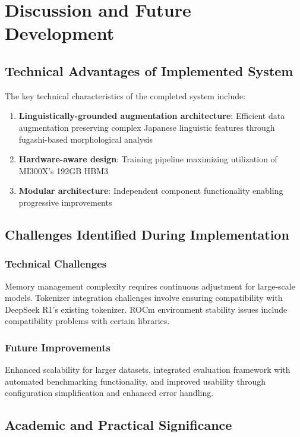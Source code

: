 \documentclass[11pt,a4paper]{article}
\begin{document}
\section{Discussion and Future Development}

\subsection{Technical Advantages of Implemented System}

The key technical characteristics of the completed system include:

\begin{enumerate}
\item \textbf{Linguistically-grounded augmentation architecture}: Efficient data augmentation preserving complex Japanese linguistic features through fugashi-based morphological analysis
\item \textbf{Hardware-aware design}: Training pipeline maximizing utilization of MI300X's 192GB HBM3
\item \textbf{Modular architecture}: Independent component functionality enabling progressive improvements
\end{enumerate}

\subsection{Challenges Identified During Implementation}

\subsubsection{Technical Challenges}
Memory management complexity requires continuous adjustment for large-scale models. Tokenizer integration challenges involve ensuring compatibility with DeepSeek R1's existing tokenizer. ROCm environment stability issues include compatibility problems with certain libraries.

\subsubsection{Future Improvements}
Enhanced scalability for larger datasets, integrated evaluation framework with automated benchmarking functionality, and improved usability through configuration simplification and enhanced error handling.

\subsection{Academic and Practical Significance}
\end{document}
